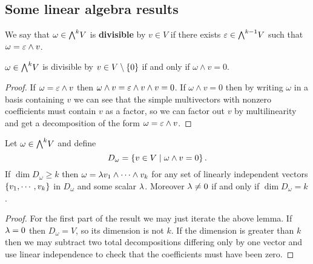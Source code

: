 \subsection{Some linear algebra results}
\begin{definition}[Divisibility]
We say that $\omega\in \bw V$ is \textbf{divisible} by $v\in V$ if there exists $\e\in \bw[k-1]V$ such that $\omega=\varepsilon\wedge v$.
\end{definition}
\begin{lemma}\label{Divisibility}
$\omega\in \bw V$ is divisible by $v\in V\setminus\{0\}$ if and only if $\omega\wedge v=0$.
\end{lemma}
\begin{proof}
If $\omega=\varepsilon\wedge v$ then $\omega\wedge v=\varepsilon\wedge v\wedge v=0$. If $\omega\wedge v=0$ then by writing $\omega$ in a basis containing $v$ we can see that the simple multivectors with nonzero coefficients must contain $v$ as a factor, so we can factor out $v$ by multilinearity and get a decomposition of the form $\omega=\varepsilon\wedge v$.
\end{proof}

\begin{corollary}\label{TotalDecomposabilityCriterion}
Let $\omega\in \bw V$ and define 
\[D_\omega=\left\{{v\in V\mid \omega\wedge v=0}\right\}.\]
If $\dim D_\omega\geq k$ then $\omega=\lambda v_1\wedge \cdots\wedge v_k$ for any set of linearly independent vectors $\left\{{v_1,\cdots, v_k}\right\}$ in $D_\omega$ and some scalar $\lambda$. 
Moreover $\lambda\neq 0$ if and only if $\dim D_\omega= k$.
\end{corollary}
\begin{proof}
For the first part of the result we may just iterate the above lemma. If $\lambda=0$ then $D_\omega=V$, so its dimension is not $k$. If the dimension is greater than $k$ then we may subtract two total decompositions differing only by one vector and use linear independence to check that the coefficients must have been zero.
\end{proof}


